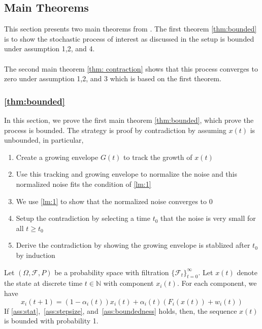 \subsection{Main Theorems}
This section presents two main theorems from \cite{tsitsiklis1994asynchronous}. The first theorem \autoref{thm:bounded} is to show the stochastic process of interest as discussed in the setup is bounded under assumption 1,2, and 4.\\
\\
The second main theorem \autoref{thm: contraction} shows that this process converges to zero under assumption 1,2, and 3 which is based on the first theorem.
\subsubsection{\autoref{thm:bounded}}
In this section, we prove the first main theorem \autoref{thm:bounded}, which prove the process is bounded.  The strategy is proof by contradiction by assuming $x(t)$ is unbounded, in particular,
\begin{enumerate}
    \item Create a growing envelope $G(t)$ to track the growth of $x(t)$
    \item Use this tracking and growing envelope to normalize the noise and this normalized noise fits the condition of \autoref{lm:1}
    \item We use \autoref{lm:1} to show that the normalized noise converges to 0
    \item Setup the contradiction by selecting a time $t_0$ that the noise is very small for all $t\ge t_0$
    \item Derive the contradiction by showing the growing envelope is stablized after $t_0$ by induction
\end{enumerate}
\begin{theorem}\label{thm:bounded}
Let $(\Omega, \mathcal{F},P)$ be a probability space with filtration $\{\mathcal{F}_t\}_{t=0}^\infty$. Let $x(t)$ denote the state at discrete time $t\in\mathbb{N}$ with component $x_i(t)$. For each component, we have
$$
x_i(t+1) = (1-\alpha_i(t))x_i(t) + \alpha_i(t)(F_i(x(t)) + w_i(t)) 
$$
If \autoref{ass:stat},~\ref{ass:stepsize}, and~\ref{ass:boundedness} holds, then, the sequence $x(t)$ is bounded with probability 1.

\end{theorem}
